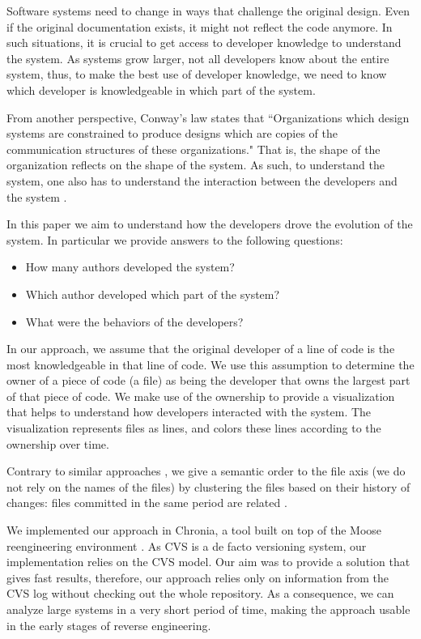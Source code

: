 \documentclass[10pt]{book}
\begin{document}
Software systems need to change in ways that challenge the original design. Even if the original documentation exists, it might not reflect the code anymore. In such situations, it is crucial to get access to developer knowledge to understand the system. As systems grow larger, not all developers know about the entire system, thus, to make the best use of developer knowledge, we need to know which developer is knowledgeable in which part of the system.

From another perspective, Conway's law \cite{Conw68a} states that ``Organizations which design systems are constrained to produce designs which are copies of the communication structures of these organizations." That is, the shape of the organization reflects on the shape of the system. As such, to understand the system, one also has to understand the interaction between the developers and the system \cite{Deme02a}.

In this paper we aim to understand how the developers drove the evolution of the system. In particular we provide answers to the following questions:
\begin{itemize}
\item How many authors developed the system?
\item Which author developed which part of the system?
\item What were the behaviors of the developers?
\end{itemize}

In our approach, we assume that the original developer of a line of code is the most knowledgeable in that line of code. We use this assumption to determine the owner of a piece of code (\eg a file) as being the developer that owns the largest part of that piece of code. We make use of the ownership to provide a visualization that helps to understand how developers interacted with the system. The visualization represents files as lines, and colors these lines according to the ownership over time.

Contrary to similar approaches \cite{Ryss04a}, we give a semantic order to the file axis (\ie we do not rely on the names of the files) by clustering the files based on their history of changes: files committed in the same period are related \cite{Gall98a}.

We implemented our approach in Chronia, a tool built on top of the Moose reengineering environment \cite{Duca05a}. As CVS is a de facto versioning system, our implementation relies on the CVS model. Our aim was to provide a solution that gives fast results, therefore, our approach relies only on information from the CVS log without checking out the whole repository. As a consequence, we can analyze large systems in a very short period of time, making the approach usable in the early stages of reverse engineering.
\end{document}
